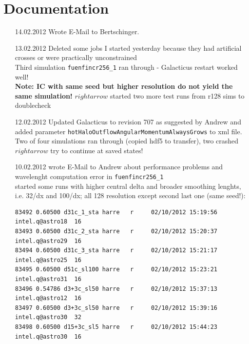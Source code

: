 \documentclass[a4paper,11pt,fleqn,oneside]{book}
\begin{document}
\tableofcontents


\chapter{Documentation}

\begin{itemize}
\item[14.02.2012]
Wrote E-Mail to Bertschinger. \\

\item[13.02.2012]
Deleted some jobs I started yesterday because they had artificial crosses 
or were practically unconstrained \\
Third simulation \texttt{fuenfincr256\_1} ran through - Galacticus 
restart worked well! \\
\textbf{Note: IC with same seed but higher resolution do not yield the same 
simulation!} $rightarrow$ started two more test runs from r128 sims to doublecheck \\


\item[12.02.2012]
Updated Galacticus to revision 707 as suggested by Andrew and added parameter 
\texttt{hotHaloOutflowAngularMomentumAlwaysGrows} to xml file. \\
Two of four simulations ran through (copied hdf5 to transfer), 
two crashed $rightarrow$ try to continue at saved states!


\item[10.02.2012]
wrote E-Mail to Andrew about performance problems and wavelenght computation error 
in \texttt{fuenfincr256\_1} \\
started some runs with higher central delta and broader smoothing lenghts, i.e. 
32/dx and 100/dx; all 128 resolution except second last one (same seed!): 
\begin{verbatim}
83492 0.60500 d31c_1_sta harre   r     02/10/2012 15:19:56 intel.q@astro18  16        
83493 0.60500 d31c_2_sta harre   r     02/10/2012 15:20:37 intel.q@astro29  16        
83494 0.60500 d31c_3_sta harre   r     02/10/2012 15:21:17 intel.q@astro25  16        
83495 0.60500 d51c_sl100 harre   r     02/10/2012 15:23:21 intel.q@astro31  16  
83496 0.54786 d3+3c_sl50 harre   r     02/10/2012 15:37:13 intel.q@astro12  16        
83497 0.60500 d3+3c_sl50 harre   r     02/10/2012 15:39:16 intel.q@astro30  32  
83498 0.60500 d15+3c_sl5 harre   r     02/10/2012 15:44:23 intel.q@astro30  16        
\end{verbatim}


\end{itemize}
\end{document}
